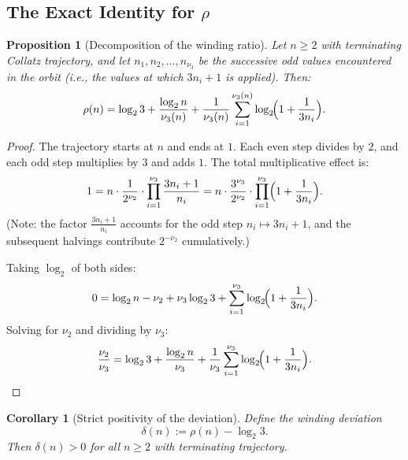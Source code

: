 \documentclass[11pt,a4paper]{article}
\theoremstyle{plain}
\newtheorem{proposition}[theorem]{Proposition}
\newtheorem{corollary}[theorem]{Corollary}
\theoremstyle{definition}
\begin{document}
\subsection{The Exact Identity for $\rho$}

\begin{proposition}[Decomposition of the winding ratio]\label{prop:rho-identity}
    Let $n \geq 2$ with terminating Collatz trajectory, and let $n_1, n_2, \ldots, n_{\nu_3}$ be the successive odd values encountered in the orbit (i.e., the values at which $3n_i + 1$ is applied). Then:
    \begin{equation}\label{eq:rho-identity}
        \rho(n) = \log_2 3 + \frac{\log_2 n}{\nu_3(n)} + \frac{1}{\nu_3(n)} \sum_{i=1}^{\nu_3(n)} \log_2\!\Bigl(1 + \frac{1}{3n_i}\Bigr).
    \end{equation}
\end{proposition}

\begin{proof}
    The trajectory starts at $n$ and ends at $1$. Each even step divides by $2$, and each odd step multiplies by $3$ and adds $1$. The total multiplicative effect is:
    \begin{equation}\label{eq:multiplicative-balance}
        1 = n \cdot \frac{1}{2^{\nu_2}} \cdot \prod_{i=1}^{\nu_3} \frac{3n_i + 1}{n_i} = n \cdot \frac{3^{\nu_3}}{2^{\nu_2}} \cdot \prod_{i=1}^{\nu_3} \Bigl(1 + \frac{1}{3n_i}\Bigr).
    \end{equation}
    (Note: the factor $\frac{3n_i+1}{n_i}$ accounts for the odd step $n_i \mapsto 3n_i + 1$, and the subsequent halvings contribute $2^{-\nu_2}$ cumulatively.)

    Taking $\log_2$ of both sides:
    \begin{equation}
        0 = \log_2 n - \nu_2 + \nu_3 \log_2 3 + \sum_{i=1}^{\nu_3} \log_2\!\Bigl(1 + \frac{1}{3n_i}\Bigr).
    \end{equation}
    Solving for $\nu_2$ and dividing by $\nu_3$:
    \begin{equation}
        \frac{\nu_2}{\nu_3} = \log_2 3 + \frac{\log_2 n}{\nu_3} + \frac{1}{\nu_3}\sum_{i=1}^{\nu_3} \log_2\!\Bigl(1 + \frac{1}{3n_i}\Bigr). \qedhere
    \end{equation}
\end{proof}

\begin{corollary}[Strict positivity of the deviation]\label{cor:delta-positive}
    Define the \emph{winding deviation}
    \begin{equation}
        \delta(n) := \rho(n) - \log_2 3.
    \end{equation}
    Then $\delta(n) > 0$ for all $n \geq 2$ with terminating trajectory.
\end{corollary}
\end{document}

